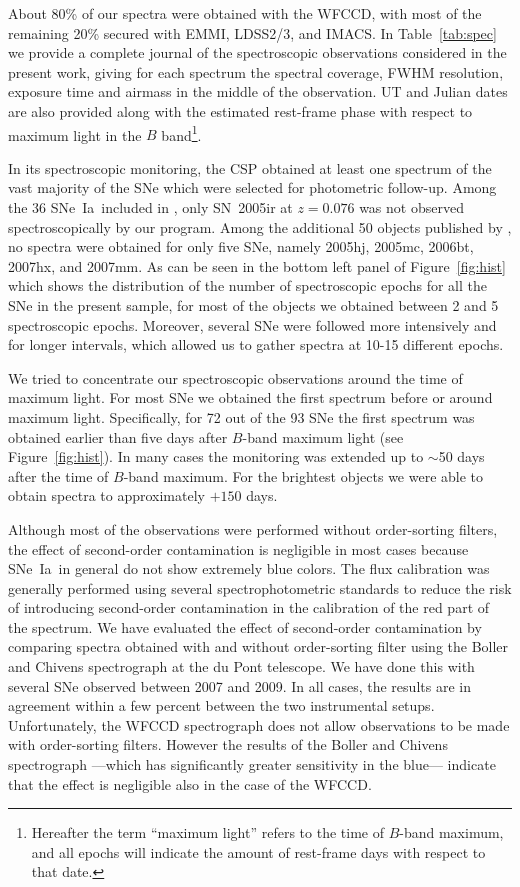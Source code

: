 \documentclass[apj]{emulateapj-rtx4}
\newcommand{\sneia}{SNe~Ia}
\begin{document}
About 80\% of our spectra were obtained with the WFCCD, with most of
the remaining 20\% secured with EMMI, LDSS2/3, and IMACS.
In Table~\ref{tab:spec} we provide a complete journal of the spectroscopic
observations considered in the present work, giving for each spectrum the
spectral coverage, FWHM resolution, exposure time and airmass in the middle
of the observation. UT and Julian dates are also provided along with the
estimated rest-frame phase with respect to maximum light in the $B$
band\footnote{Hereafter the term ``maximum light'' refers to the time
  of $B$-band maximum, and all epochs will indicate the amount of
  rest-frame days with respect to that date.}. 

In its spectroscopic monitoring, the CSP obtained at least one
spectrum of the vast majority of the SNe which were selected for
photometric follow-up. Among the 36 \sneia\ included in
\citet{contreras10}, only SN~2005ir at $z=0.076$ was not observed 
spectroscopically by our program. Among the additional 50 objects published by
\citet{stritzinger11}, no spectra were obtained for only five SNe,
namely 2005hj, 2005mc, 2006bt, 2007hx, and 2007mm. As can be seen in the
bottom left panel of Figure~\ref{fig:hist} which shows the distribution
of the number of spectroscopic epochs for all the SNe in 
the present sample, for most of the objects we obtained between 2 and
5 spectroscopic epochs. Moreover, several SNe 
were followed more intensively and for longer intervals, which allowed
us to gather spectra at 10-15 different epochs.

We tried to concentrate our spectroscopic observations around the time
of maximum light. For most SNe we obtained the first spectrum
before or around maximum light. Specifically, for 72 out of
the 93 SNe the first spectrum was obtained earlier than five days
after $B$-band maximum light (see Figure~\ref{fig:hist}). In many
cases the monitoring was extended up to $\sim$50 days after the time
of $B$-band maximum. For the brightest objects we were able to obtain
spectra to approximately $+150$ days.  

Although most of the observations were performed without order-sorting
filters, the effect of second-order contamination is
negligible in most cases because \sneia\ in general do not show
extremely blue colors. The flux calibration was generally performed
using several spectrophotometric standards to reduce the risk of
introducing second-order contamination in the calibration of the red
part of the spectrum. We have evaluated the effect of second-order
contamination by comparing spectra obtained with
and without order-sorting filter using the Boller and Chivens
spectrograph at the du Pont telescope. We have done this with several
SNe observed between 2007 and 2009. In all cases, the results
are in agreement within a few percent between the two
instrumental setups. Unfortunately, the WFCCD spectrograph does not
allow observations to be made with order-sorting filters. However the
results of the Boller and Chivens spectrograph ---which has
significantly greater sensitivity in
the blue--- indicate that the effect is negligible also in the case of
the WFCCD. 
\end{document}

